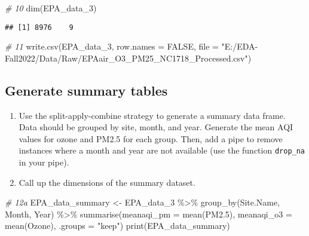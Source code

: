 \documentclass[
]{article}
\newenvironment{Shaded}{\begin{snugshade}}{\end{snugshade}}
\newcommand{\AttributeTok}[1]{\textcolor[rgb]{0.77,0.63,0.00}{#1}}
\newcommand{\CommentTok}[1]{\textcolor[rgb]{0.56,0.35,0.01}{\textit{#1}}}
\newcommand{\ConstantTok}[1]{\textcolor[rgb]{0.00,0.00,0.00}{#1}}
\newcommand{\FloatTok}[1]{\textcolor[rgb]{0.00,0.00,0.81}{#1}}
\newcommand{\FunctionTok}[1]{\textcolor[rgb]{0.00,0.00,0.00}{#1}}
\newcommand{\NormalTok}[1]{#1}
\newcommand{\OtherTok}[1]{\textcolor[rgb]{0.56,0.35,0.01}{#1}}
\newcommand{\SpecialCharTok}[1]{\textcolor[rgb]{0.00,0.00,0.00}{#1}}
\newcommand{\StringTok}[1]{\textcolor[rgb]{0.31,0.60,0.02}{#1}}
\begin{document}
\begin{Shaded}
\begin{Highlighting}[]
\CommentTok{\# 10}
\FunctionTok{dim}\NormalTok{(EPA\_data\_3)}
\end{Highlighting}
\end{Shaded}

\begin{verbatim}
## [1] 8976    9
\end{verbatim}

\begin{Shaded}
\begin{Highlighting}[]
\CommentTok{\# 11}
\FunctionTok{write.csv}\NormalTok{(EPA\_data\_3, }\AttributeTok{row.names =} \ConstantTok{FALSE}\NormalTok{, }\AttributeTok{file =} \StringTok{"E:/EDA{-}Fall2022/Data/Raw/EPAair\_O3\_PM25\_NC1718\_Processed.csv"}\NormalTok{)}
\end{Highlighting}
\end{Shaded}

\hypertarget{generate-summary-tables}{%
\subsection{Generate summary tables}\label{generate-summary-tables}}

\begin{enumerate}
\def\labelenumi{\arabic{enumi}.}
\setcounter{enumi}{11}
\item
  Use the split-apply-combine strategy to generate a summary data frame.
  Data should be grouped by site, month, and year. Generate the mean AQI
  values for ozone and PM2.5 for each group. Then, add a pipe to remove
  instances where a month and year are not available (use the function
  \texttt{drop\_na} in your pipe).
\item
  Call up the dimensions of the summary dataset.
\end{enumerate}

\begin{Shaded}
\begin{Highlighting}[]
\CommentTok{\# 12a}
\NormalTok{EPA\_data\_summary }\OtherTok{\textless{}{-}}\NormalTok{ EPA\_data\_3 }\SpecialCharTok{\%\textgreater{}\%}
    \FunctionTok{group\_by}\NormalTok{(Site.Name, Month, Year) }\SpecialCharTok{\%\textgreater{}\%}
    \FunctionTok{summarise}\NormalTok{(}\AttributeTok{meanaqi\_pm =} \FunctionTok{mean}\NormalTok{(PM2}\FloatTok{.5}\NormalTok{), }\AttributeTok{meanaqi\_o3 =} \FunctionTok{mean}\NormalTok{(Ozone), }\AttributeTok{.groups =} \StringTok{"keep"}\NormalTok{)}
\FunctionTok{print}\NormalTok{(EPA\_data\_summary)}
\end{Highlighting}
\end{Shaded}
\end{document}
